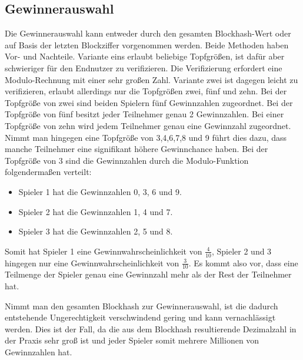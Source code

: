 \subsection{Gewinnerauswahl}\label{btc_gewinnerauswahl}
Die Gewinnerauswahl kann entweder durch den gesamten Blockhash-Wert oder auf Basis der letzten Blockziffer vorgenommen werden.
Beide Methoden haben Vor- und Nachteile. Variante eins erlaubt beliebige Topfgrößen, ist dafür aber schwieriger für den Endnutzer zu verifizieren. Die Verifizierung erfordert eine Modulo-Rechnung mit einer sehr großen Zahl. Variante zwei ist dagegen leicht zu verifizieren, erlaubt allerdings nur die Topfgrößen zwei, fünf und zehn. Bei der Topfgröße von zwei sind beiden Spielern fünf Gewinnzahlen zugeordnet. Bei der Topfgröße von fünf besitzt jeder Teilnehmer genau 2 Gewinnzahlen. Bei einer Topfgröße von zehn wird jedem Teilnehmer genau eine Gewinnzahl zugeordnet. 
Nimmt man hingegen eine Topfgröße von 3,4,6,7,8 und 9 führt dies dazu, dass manche Teilnehmer eine signifikant höhere Gewinnchance haben.
Bei der Topfgröße von 3 sind die Gewinnzahlen durch die Modulo-Funktion folgendermaßen verteilt:
\begin{itemize}
\item Spieler 1 hat die Gewinnzahlen 0, 3, 6 und 9.
\item Spieler 2 hat die Gewinnzahlen 1, 4 und 7.
\item Spieler 3 hat die Gewinnzahlen 2, 5 und 8.
\end{itemize}
Somit hat Spieler 1 eine Gewinnwahrscheinlichkeit von $\frac{4}{10}$, Spieler 2 und 3 hingegen nur eine Gewinnwahrscheinlichkeit von $\frac{3}{10}$. Es kommt also vor, dass eine Teilmenge der Spieler genau eine Gewinnzahl mehr als der Rest der Teilnehmer hat.

Nimmt man den gesamten Blockhash zur Gewinnerauswahl, ist die dadurch entstehende Ungerechtigkeit verschwindend gering und kann vernachlässigt werden. Dies ist der Fall, da die aus dem Blockhash resultierende Dezimalzahl in der Praxis sehr groß ist und jeder Spieler somit mehrere Millionen von Gewinnzahlen hat.

